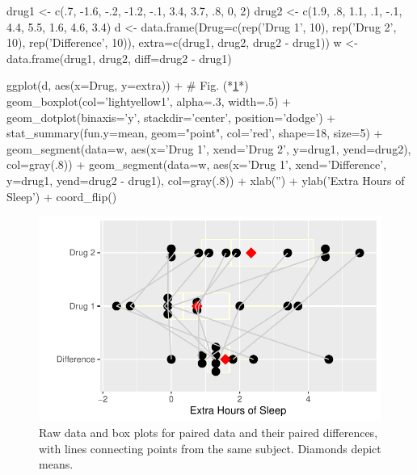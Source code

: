 \begin{Schunk}
\begin{Sinput}
drug1 <- c(.7, -1.6, -.2, -1.2, -.1, 3.4, 3.7, .8, 0, 2)
drug2 <- c(1.9, .8, 1.1, .1, -.1, 4.4, 5.5, 1.6, 4.6, 3.4)
d <- data.frame(Drug=c(rep('Drug 1', 10), rep('Drug 2', 10),
                  rep('Difference', 10)),
                extra=c(drug1, drug2, drug2 - drug1))
w <- data.frame(drug1, drug2, diff=drug2 - drug1)

ggplot(d, aes(x=Drug, y=extra)) +   # Fig. (*\ref{fig:htest-tplot}*)
  geom_boxplot(col='lightyellow1', alpha=.3, width=.5) + 
  geom_dotplot(binaxis='y', stackdir='center', position='dodge') +
  stat_summary(fun.y=mean, geom="point", col='red', shape=18, size=5) +
  geom_segment(data=w, aes(x='Drug 1', xend='Drug 2', y=drug1, yend=drug2),
               col=gray(.8)) +
  geom_segment(data=w, aes(x='Drug 1', xend='Difference', y=drug1, yend=drug2 - drug1),
               col=gray(.8)) +
  xlab('') + ylab('Extra Hours of Sleep') + coord_flip() 
\end{Sinput}
\begin{figure}[htbp]

\centerline{\includegraphics[width=\maxwidth]{htest-tplot-1} }

\caption[Data and box plots for paired data]{Raw data and box plots for paired data and their paired differences, with lines connecting points from the same subject.  Diamonds depict means.}\label{fig:htest-tplot}
\end{figure}
\end{Schunk}


